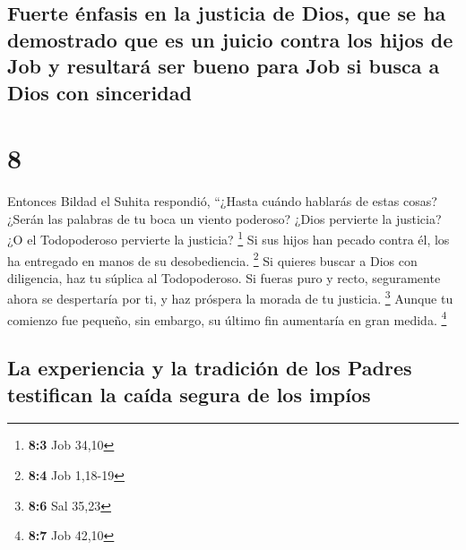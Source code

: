 \begin{paracol}{2}
{\subsection{Fuerte énfasis en la justicia de Dios, que se ha demostrado
que es un juicio contra los hijos de Job y resultará ser bueno para Job
si busca a Dios con
sinceridad}\label{fuerte-uxe9nfasis-en-la-justicia-de-dios-que-se-ha-demostrado-que-es-un-juicio-contra-los-hijos-de-job-y-resultaruxe1-ser-bueno-para-job-si-busca-a-dios-con-sinceridad}}

\hypertarget{section-14}{%
\section{8}\label{section-14}}

 Entonces Bildad el Suhita respondió, 
``¿Hasta cuándo hablarás de estas cosas? ¿Serán las palabras de tu boca
un viento poderoso?  ¿Dios pervierte la justicia? ¿O el
Todopoderoso pervierte la justicia? \footnote{\textbf{8:3} Job 34,10}
 Si sus hijos han pecado contra él, los ha entregado en
manos de su desobediencia. \footnote{\textbf{8:4} Job 1,18-19}
 Si quieres buscar a Dios con diligencia, haz tu súplica
al Todopoderoso.  Si fueras puro y recto, seguramente
ahora se despertaría por ti, y haz próspera la morada de tu justicia.
\footnote{\textbf{8:6} Sal 35,23}  Aunque tu comienzo fue
pequeño, sin embargo, su último fin aumentaría en gran medida.
\footnote{\textbf{8:7} Job 42,10}

\hypertarget{la-experiencia-y-la-tradiciuxf3n-de-los-padres-testifican-la-cauxedda-segura-de-los-impuxedos}{%
\subsection{La experiencia y la tradición de los Padres testifican la
caída segura de los
impíos}\label{la-experiencia-y-la-tradiciuxf3n-de-los-padres-testifican-la-cauxedda-segura-de-los-impuxedos}}


\end{paracol}
